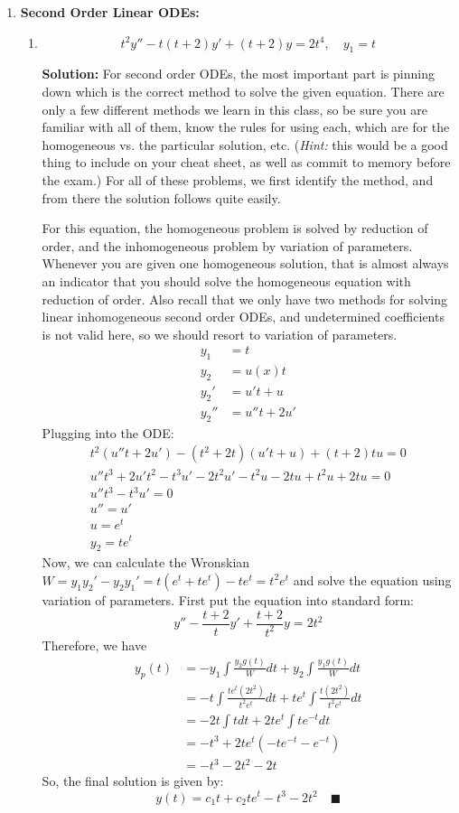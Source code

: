 \documentclass[letterpaper, fontsize=10pt]{scrartcl} %
\numberwithin{equation}{section} %
\numberwithin{figure}{section} %
\numberwithin{table}{section} %
\begin{document}
\begin{enumerate}


\item \textbf{Second Order Linear ODEs:}  \begin{enumerate}[label=(\alph*)]
\item \[ t^2y'' - t(t+2)y' +(t+2)y= 2t^4, \quad y_1 = t\]
\par \textbf{Solution:} For second order ODEs, the most important part is pinning down which is the correct method to solve the given equation. There are only a few different methods we learn in this class, so be sure you are familiar with all of them, know the rules for using each, which are for the homogeneous vs. the particular solution, etc. (\textit{Hint:} this would be a good thing to include on your cheat sheet, as well as commit to memory before the exam.) For all of these problems, we first identify the method, and from there the solution follows quite easily. 
\par For this equation, the homogeneous problem is solved by reduction of order, and the inhomogeneous problem by variation of parameters. Whenever you are given one homogeneous solution, that is almost always an indicator that you should solve the homogeneous equation with reduction of order. Also recall that we only have two methods for solving linear inhomogeneous second order ODEs, and undetermined coefficients is not valid here, so we should resort to variation of parameters. 
\begin{align*} 
y_1 &= t\\
y_2 &= u(x)t\\
y_2' &= u' t + u\\
y_2''&= u''t + 2u' 
\end{align*}
Plugging into the ODE:
\begin{gather*}
t^2(u''t + 2u') - (t^2 + 2t)(u't + u) + (t+2)tu = 0\\
u''t^3 + 2u't^2 - t^3u' - 2t^2u' - t^2u-2tu + t^2 u+2tu = 0\\
u''t^3  - t^3u'= 0\\
u'' = u'\\
u = e^t \\
y_2 = te^t
\end{gather*}
Now, we can calculate the Wronskian $W = y_1 y_2' - y_2 y_1' = t(e^t + te^t) - te^t = t^2 e^t$ and solve the equation using variation of parameters. First put the equation into standard form:
\[ y'' -\frac{ t+2}{t}y' +\frac{t+2}{t^2} y= 2t^2 \]
Therefore, we have 
\begin{align*}
y_p(t) &= -y_1 \int \frac{y_2 g(t)}{W}dt + y_2 \int \frac{y_1 g(t)}{W}dt \\
&= -t \int \frac{te^t (2t^2)}{t^2 e^t}dt + te^t \int \frac{t (2t^2)}{t^2 e^t}dt \\
&= -2t \int t dt + 2te^t \int te^{-t} dt \\
&= -t^3 + 2te^t\left( -te^{-t} - e^{-t}\right) \\
&= -t^3 - 2t^2 - 2t 
\end{align*}
So, the final solution is given by:
\[ y(t) = c_1 t + c_2 te^t - t^3 - 2t^2 \quad\blacksquare\]


\end{enumerate}
\end{enumerate}
\end{document}
